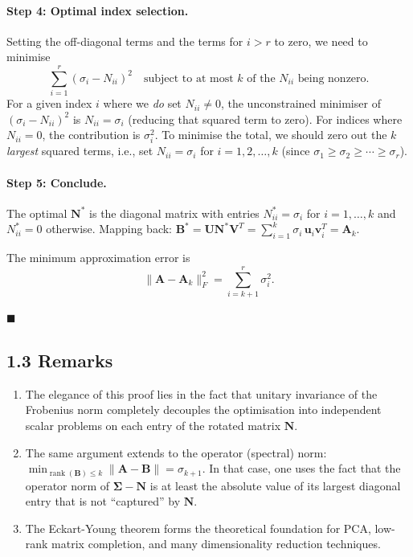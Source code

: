 \documentclass[11pt]{article}
\begin{document}
\paragraph{Step 4: Optimal index selection.}
Setting the off-diagonal terms and the terms for $i > r$ to zero, we need to minimise
\[
\sum_{i=1}^{r}(\sigma_i - N_{ii})^2
\quad\text{subject to at most $k$ of the $N_{ii}$ being nonzero.}
\]
For a given index $i$ where we \emph{do} set $N_{ii} \neq 0$, the unconstrained
minimiser of $(\sigma_i - N_{ii})^2$ is $N_{ii} = \sigma_i$ (reducing that squared term to zero).
For indices where $N_{ii} = 0$, the contribution is $\sigma_i^2$.
To minimise the total, we should zero out the $k$ \emph{largest} squared terms, i.e., set $N_{ii} = \sigma_i$ for $i = 1, 2, \dots, k$ (since $\sigma_1 \geq \sigma_2 \geq \cdots \geq \sigma_r$).

\paragraph{Step 5: Conclude.}
The optimal $\boldsymbol{N}^*$ is the diagonal matrix with entries
$N^*_{ii} = \sigma_i$ for $i=1,\dots,k$ and $N^*_{ii}=0$ otherwise.
Mapping back: $\boldsymbol{B}^* = \boldsymbol{U}\boldsymbol{N}^*\boldsymbol{V}^T = \sum_{i=1}^k \sigma_i\,\boldsymbol{u}_i\boldsymbol{v}_i^T = \boldsymbol{A}_k$.

The minimum approximation error is
\[
\|\boldsymbol{A} - \boldsymbol{A}_k\|_F^2
= \sum_{i=k+1}^{r}\sigma_i^2.
\]

\hfill$\blacksquare$

\subsection*{1.3 Remarks}

\begin{enumerate}
\item The elegance of this proof lies in the fact that unitary invariance of the Frobenius norm
completely decouples the optimisation into independent scalar problems on each entry
of the rotated matrix $\boldsymbol{N}$.

\item The same argument extends to the operator (spectral) norm:
$\min_{\operatorname{rank}(\boldsymbol{B})\leq k}\|\boldsymbol{A}-\boldsymbol{B}\| = \sigma_{k+1}$.
In that case, one uses the fact that the operator norm of $\boldsymbol{\Sigma}-\boldsymbol{N}$
is at least the absolute value of its largest diagonal entry that is not ``captured'' by $\boldsymbol{N}$.

\item The Eckart-Young theorem forms the theoretical foundation for PCA, low-rank matrix
completion, and many dimensionality reduction techniques.
\end{enumerate}
\end{document}
